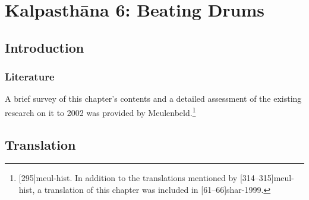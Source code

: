 \chapter{Kalpasthāna 6: Beating Drums}
\label{dundubhi}

\section{Introduction}

\subsection{Literature}

A brief survey of this chapter's contents and a detailed assessment
of the existing research on it to 2002 was provided by
Meulenbeld.\footnote{[295]{meul-hist}. In addition to the
    translations mentioned by [314--315]{meul-hist}, a
    translation of this chapter was included in
    [61--66]{shar-1999}.} 
%    

\section{Translation}

